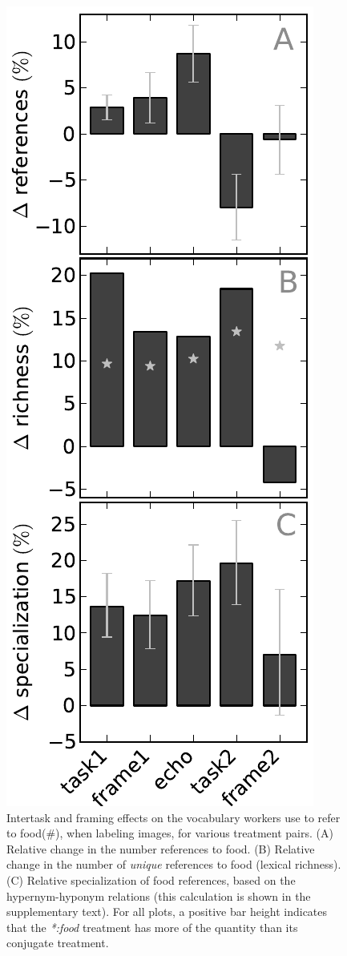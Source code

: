 \documentclass[12pt]{article}
\begin{document}
\begin{figure}
	\centering
	\includegraphics[scale=1]{figs/vocab_specificity.pdf}
	\caption{
		Intertask and framing effects on the vocabulary workers use to refer 
		to food(\#), when labeling images, for various treatment pairs.
		(A) Relative change in the number references to food. 
		(B) Relative change in the number of \textit{unique} 
		references to food (lexical richness). 
		(C) Relative specialization of food references, based on the 
		hypernym-hyponym relations (this calculation is shown in the 
		supplementary text).  For all
		plots, a positive bar height indicates that the \textit{*:food}
		treatment has more of the quantity than its conjugate treatment.
	}
	\label{fig:specificity}
\end{figure}
\end{document}
